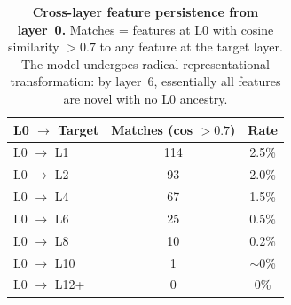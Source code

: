 \documentclass[onecolumn]{article}
\begin{document}
\begin{table}[H]
\centering
\caption{\textbf{Cross-layer feature persistence from layer~0.} Matches = features at L0 with cosine similarity $> 0.7$ to any feature at the target layer. The model undergoes radical representational transformation: by layer~6, essentially all features are novel with no L0 ancestry.}
\label{tab:persistence}
\smallskip
\begin{tabular}{lcc}
\toprule
L0 $\to$ Target & Matches (cos $> 0.7$) & Rate \\
\midrule
L0 $\to$ L1  & 114 & 2.5\% \\
L0 $\to$ L2  & 93 & 2.0\% \\
L0 $\to$ L4  & 67 & 1.5\% \\
L0 $\to$ L6  & 25 & 0.5\% \\
L0 $\to$ L8  & 10 & 0.2\% \\
L0 $\to$ L10 & 1 & $\sim$0\% \\
L0 $\to$ L12+ & 0 & 0\% \\
\bottomrule
\end{tabular}
\end{table}
\end{document}
